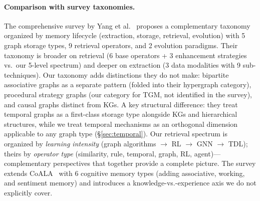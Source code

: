 \documentclass[hf]{ceurart}
\begin{document}
\paragraph{Comparison with survey taxonomies.}
The comprehensive survey by Yang et al.~\cite{graphmemsurvey2026}
proposes a complementary taxonomy organized by memory lifecycle
(extraction, storage, retrieval, evolution) with 5 graph storage types,
9 retrieval operators, and 2 evolution paradigms. Their taxonomy is
broader on retrieval (6 base operators + 3 enhancement strategies vs.\
our 5-level spectrum) and deeper on extraction (3 data modalities
with 9 sub-techniques). Our taxonomy adds distinctions they do not
make: bipartite associative graphs as a separate pattern (folded into
their hypergraph category), procedural strategy graphs (our category
for TGM, not identified in the survey), and causal graphs distinct
from KGs. A key structural difference: they treat temporal graphs as a
first-class storage type alongside KGs and hierarchical structures,
while we treat temporal mechanisms as an orthogonal dimension
applicable to any graph type (\S\ref{sec:temporal}). Our retrieval
spectrum is organized by \emph{learning intensity} (graph algorithms
$\to$ RL $\to$ GNN $\to$ TDL); theirs by \emph{operator type}
(similarity, rule, temporal, graph, RL, agent)---complementary
perspectives that together provide a complete picture. The survey
extends CoALA~\cite{sumers2024} with 6 cognitive memory types
(adding associative, working, and sentiment memory) and introduces
a knowledge-vs.-experience axis we do not explicitly cover.
\end{document}
